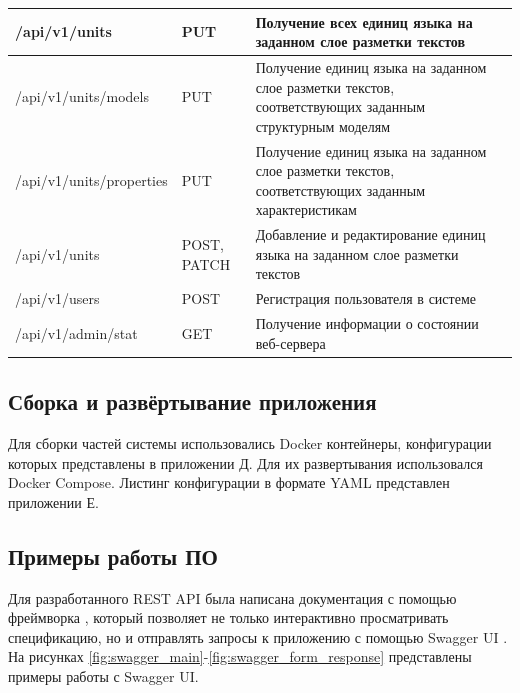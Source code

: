 \begin{landscape}
\begin{longtable}{|p{}|p{}|p{}|}
		/api/v1/units    		& PUT 		& Получение всех единиц языка на заданном слое разметки текстов \\\hline
		/api/v1/units/models    	& PUT 		& Получение единиц языка на заданном слое разметки текстов, соответствующих заданным структурным моделям \\\hline
		/api/v1/units/properties    & PUT 		& Получение единиц языка на заданном слое разметки текстов, соответствующих заданным характеристикам \\\hline
		/api/v1/units              	& POST, PATCH& Добавление и редактирование единиц языка на заданном слое разметки текстов\\\hline
		
		/api/v1/users            	& POST 		& Регистрация пользователя в системе \\\hline
		
		/api/v1/admin/stat        	& GET 		& Получение информации о состоянии веб-сервера \\
	\end{longtable}
\end{landscape}

\subsection{Сборка и развёртывание приложения}


Для сборки частей системы использовались Docker контейнеры, конфигурации которых представлены в приложении Д. Для их развертывания использовался Docker Compose. Листинг конфигурации в формате YAML представлен приложении Е.

\subsection{Примеры работы ПО}

Для разработанного REST API была написана документация с помощью фреймворка \cite{Swagger}, который позволяет не только интерактивно просматривать спецификацию, но и отправлять запросы к приложению с помощью Swagger UI \cite{Swagger_UI}. На рисунках \ref{fig:swagger_main}-\ref{fig:swagger_form_response} представлены примеры работы с Swagger UI.

